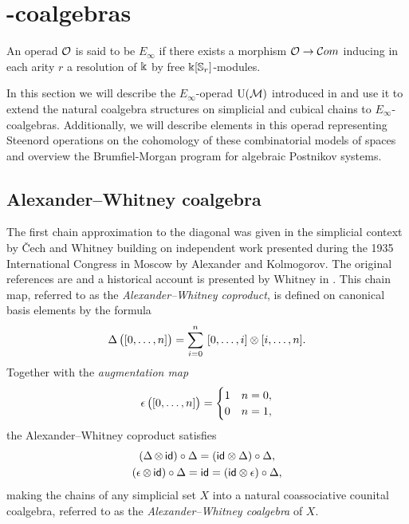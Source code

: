 
\section{\pdfEinfty-coalgebras} \label{s:integrally}

An operad $\mathcal{O}$ is said to be $E_\infty$ if there exists a morphism $\mathcal{O} \to \mathcal{C}om$ inducing in each arity $r$ a resolution of $\Bbbk$ by free $\Bbbk[\mathbb{S}_r]$-modules.

In this section we will describe the $E_\infty$-operad $\operatorname{U}(\mathcal{M})$ introduced in \cite{medina2020prop1} and use it to extend the natural coalgebra structures on simplicial and cubical chains to $E_\infty$-coalgebras.
Additionally, we will describe elements in this operad representing Steenord operations on the cohomology of these combinatorial models of spaces and overview the Brumfiel-Morgan program for algebraic Postnikov systems.

\subsection{Alexander--Whitney coalgebra} \label{ss:aw diagonal}

The first chain approximation to the diagonal was given in the simplicial context by \v{C}ech and Whitney building on independent work presented during the 1935 International Congress in Moscow by Alexander and Kolmogorov.
The original references are \cite{alexander1936ring, cech1936multiplication, whitney1938products} and a historical account is presented by Whitney in \cite[p.110]{whitney1988history}.
This chain map, referred to as the \textit{Alexander--Whitney coproduct}, is defined on canonical basis elements by the formula
\begin{equation} \label{e:alexander-whitney coalgebra}
\operatorname{\Delta} \big( [0,\dots,n] \big) = \sum_{i=0}^n \ [0, \dots, i] \otimes [i, \dots, n].
\end{equation}
Together with the \textit{augmentation map}
\begin{equation} \label{e:augmentation map}
\operatorname{\epsilon} \big( [0,\dots,n] \big) =
\begin{cases}
1 & n=0, \\ 0 & n=1,
\end{cases}
\end{equation}
the Alexander--Whitney coproduct satisfies
\begin{gather}
\label{e:coassociativity relation}
(\operatorname{\Delta} \otimes \, \mathsf{id}) \circ \operatorname{\Delta} = (\mathsf{id} \otimes \operatorname{\Delta}) \circ \operatorname{\Delta}, \\
\label{e:counital relation}
(\operatorname{\epsilon} \otimes \, \mathsf{id}) \circ \operatorname{\Delta} = \mathsf{id} = (\mathsf{id} \otimes \operatorname{\epsilon}) \circ \operatorname{\Delta},
\end{gather}
making the chains of any simplicial set $X$ into a natural coassociative counital coalgebra, referred to as the \textit{Alexander--Whitney coalgebra} of $X$.

